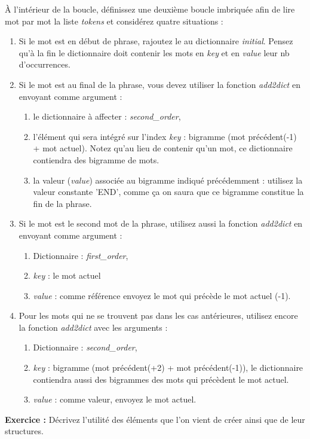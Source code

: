 À l’intérieur de la boucle, définissez une deuxième boucle imbriquée afin de lire mot par mot la liste \textit{tokens} et considérez quatre situations :
\begin{enumerate}
	\item Si le mot est en début de phrase, rajoutez le au dictionnaire \textit{initial}. Pensez qu'à la fin le dictionnaire doit contenir les mots en \textit{key} et en \textit{value} leur nb d'occurrences.
	\item Si le mot est au final de la phrase, vous devez utiliser la fonction \textit{add2dict} en envoyant comme argument :
	\begin{enumerate}
		\item le dictionnaire à affecter : \textit{second\_order},
		\item l'élément qui sera intégré sur l'index \textit{key} : bigramme (mot précédent(-1) + mot actuel). Notez qu'au lieu de contenir qu'un mot, ce dictionnaire contiendra des bigramme de mots.
		\item la valeur (\textit{value}) associée au bigramme indiqué précédemment : utilisez la valeur constante 'END', comme ça on saura que ce bigramme constitue la fin de la phrase.
	\end{enumerate}
	\item Si le mot est le second mot de la phrase, utilisez aussi la fonction \textit{add2dict} en envoyant comme argument :
	\begin{enumerate}
		\item Dictionnaire : \textit{first\_order},
		\item \textit{key} : le mot actuel
		\item \textit{value} : comme référence envoyez le mot qui précède le mot actuel (-1).
	\end{enumerate}
	\item Pour les mots qui ne se trouvent pas dans les cas antérieures, utilisez encore la fonction \textit{add2dict} avec les arguments :
	\begin{enumerate}
		\item Dictionnaire : \textit{second\_order},
		\item \textit{key} : bigramme (mot précédent(+2) + mot précédent(-1)), le dictionnaire contiendra aussi des bigrammes des mots qui précèdent le mot actuel.
		\item \textit{value} : comme valeur, envoyez le mot actuel.
	\end{enumerate}
\end{enumerate}

\textbf{Exercice :}
Décrivez l'utilité des éléments que l'on vient de créer ainsi que de leur structures.